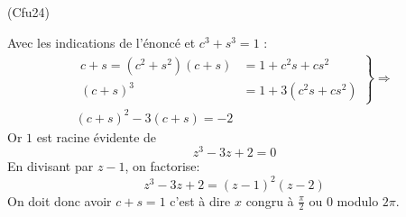 \begin{tiny}(Cfu24)\end{tiny} Avec les indications de l'énoncé et $c^3+s^3=1$ :
\begin{multline*}
\left. 
\begin{aligned}
  c+s=(c^2+s^2)(c+s) &= 1 + c^2s + cs^2 \\
  (c+s)^3 &= 1 + 3(c^2s + cs^2)
\end{aligned}
\right\rbrace \Rightarrow \\
(c+s)^2-3(c+s) = -2
\end{multline*}
Or $1$ est racine évidente de
\begin{displaymath}
  z^3-3z+2 = 0
\end{displaymath}
En divisant par $z-1$, on factorise:
\begin{displaymath}
  z^3-3z+2=(z-1)^2(z-2)
\end{displaymath}
On doit donc avoir $c+s=1$ c'est à dire $x$ congru à $\frac{\pi}{2}$ ou $0$ modulo $2\pi$.